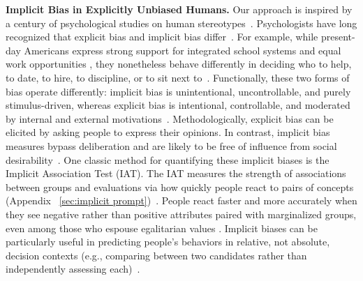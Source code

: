 \textbf{Implicit Bias in Explicitly Unbiased Humans.}
Our approach is inspired by a century of psychological studies on human stereotypes~\cite{allport1954nature, katz1933racial, lippmann1922public}. 
%
Psychologists have long recognized that explicit bias and implicit bias differ~\cite{bargh1996automaticity, greenwald1995implicit}.
%
For example, while present-day Americans express strong support for integrated school systems and equal work opportunities \cite{bogardus1925measuring, schuman1997racial}, they nonetheless behave differently in deciding who to help, to date, to hire, to discipline, or to sit next to~\cite{bertrand2004emily, crosby1980recent, dovidio1981effects, word1974nonverbal}. 
%
Functionally, these two forms of bias operate differently: implicit bias is unintentional, uncontrollable, and purely stimulus-driven, whereas explicit bias is intentional, controllable, and moderated by internal and external motivations~\cite{fiske2013social, bargh1996automaticity, greenwald2017implicit, nosek2005moderators}.
%
Methodologically, explicit bias can be elicited by asking people to express their opinions. In contrast, implicit bias measures bypass deliberation and are likely to be free of influence from social desirability~\cite{fazio2003implicit, posner2004attention}.
%
One classic method for quantifying these implicit biases is the Implicit Association Test (IAT).
The IAT measures the strength of associations between groups and evaluations via how quickly people react to pairs of concepts (Appendix ~\ref{sec:implicit prompt})~\cite{graf1985implicit, greenwald1995implicit, posner2004attention}.
People react faster and more accurately when they see negative rather than positive attributes paired with marginalized groups, even among those who espouse egalitarian values \cite{monteith1993self}. 
%
Implicit biases can be particularly useful in predicting people's behaviors in relative, not absolute, decision contexts (e.g., comparing between two candidates rather than independently assessing each)~\cite{devine2001implicit, kurdi2019relationship}. 

